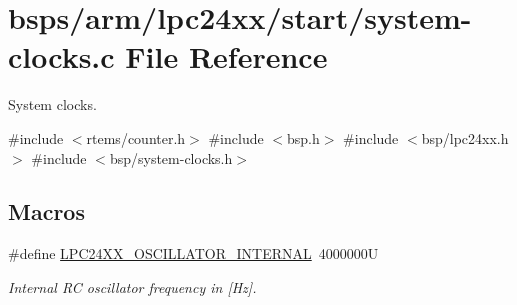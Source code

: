 \hypertarget{lpc24xx_2start_2system-clocks_8c}{}\section{bsps/arm/lpc24xx/start/system-\/clocks.c File Reference}
\label{lpc24xx_2start_2system-clocks_8c}


System clocks.  


{\ttfamily \#include $<$rtems/counter.\+h$>$}\newline
{\ttfamily \#include $<$bsp.\+h$>$}\newline
{\ttfamily \#include $<$bsp/lpc24xx.\+h$>$}\newline
{\ttfamily \#include $<$bsp/system-\/clocks.\+h$>$}\newline
\subsection*{Macros}
\begin{DoxyCompactItemize}
\item 
\mbox{\label{lpc24xx_2start_2system-clocks_8c_a9f2eec5edeae14eae19e9fcdb4fd1d29}} 
\#define \mbox{\hyperlink{lpc24xx_2start_2system-clocks_8c_a9f2eec5edeae14eae19e9fcdb4fd1d29}{L\+P\+C24\+X\+X\+\_\+\+O\+S\+C\+I\+L\+L\+A\+T\+O\+R\+\_\+\+I\+N\+T\+E\+R\+N\+AL}}~4000000U
\begin{DoxyCompactList}\small\item\em Internal RC oscillator frequency in \mbox{[}Hz\mbox{]}. \end{DoxyCompactList}\end{DoxyCompactItemize}
